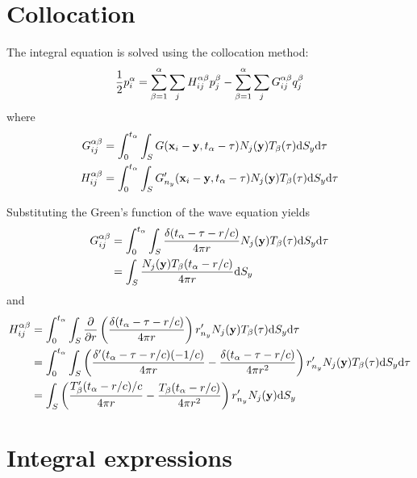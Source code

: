 \documentclass[a4paper,11pt,twoside]{article}
\newcommand{\td}{\mathrm{d}}
\begin{document}
\section{Collocation}

The integral equation is solved using the collocation method:
%
\begin{equation}
\frac{1}{2}p_{i}^{\alpha} =
\sum_{\beta = 1}^{\alpha} \sum_j 
H_{ij}^{\alpha \beta}
p^{\beta}_{j} \\
-
\sum_{\beta = 1}^{\alpha} \sum_j 
G_{ij}^{\alpha \beta}
q^{\beta}_{j} 
\end{equation}
%
where
%
\begin{align}
G_{ij}^{\alpha \beta} &=
\int_{0}^{t_{\alpha}} \int_{S}
G({\bf x}_i-{\bf y}, t_{\alpha}-\tau)
N_j({\bf y}) T_{\beta}(\tau)
\td S_{y} \td \tau
\nonumber \\
H_{ij}^{\alpha \beta} &=
\int_{0}^{t_{\alpha}} \int_{S}
G'_{n_y}({\bf x}_i-{\bf y}, t_{\alpha}-\tau)
N_j({\bf y}) T_{\beta}(\tau)
\td S_{y} \td \tau
\end{align}

Substituting the Green's function of the wave equation yields
%
\begin{align}
G_{ij}^{\alpha \beta}
&=
\int_{0}^{t_{\alpha}} \int_{S}
\frac{\delta(t_{\alpha}-\tau-r/c)}{4\pi r}
N_j({\bf y}) T_{\beta}(\tau)
\td S_{y} \td \tau
\nonumber \\
&=
\int_{S}
\frac{N_j({\bf y}) T_{\beta}(t_{\alpha}-r/c)}{4\pi r}
\td S_{y}
\end{align}
%
and
%
\begin{align}
H_{ij}^{\alpha \beta}
&=
\int_{0}^{t_{\alpha}} \int_{S}
\frac{\partial}{\partial r}\left(\frac{\delta(t_{\alpha}-\tau-r/c)}{4\pi r}\right)
r'_{n_{y}}
N_j({\bf y}) T_{\beta}(\tau)
\td S_{y} \td \tau
\nonumber \\
&=
\int_{0}^{t_{\alpha}} \int_{S}
\left(
\frac{\delta'(t_{\alpha}-\tau-r/c)(-1/c)}{4\pi r}
-
\frac{\delta(t_{\alpha}-\tau-r/c)}{4\pi r^2}
\right)
r'_{n_{y}}
N_j({\bf y}) T_{\beta}(\tau)
\td S_{y} \td \tau
\nonumber \\
&=
\int_{S}
\left(
\frac{T'_{\beta}(t_{\alpha}-r/c)/c}{4\pi r}
-
\frac{T_{\beta}(t_{\alpha}-r/c)}{4\pi r^2}
\right)
r'_{n_{y}}
N_j({\bf y})
\td S_{y}
\end{align}
%

\section{Integral expressions}
\end{document}
